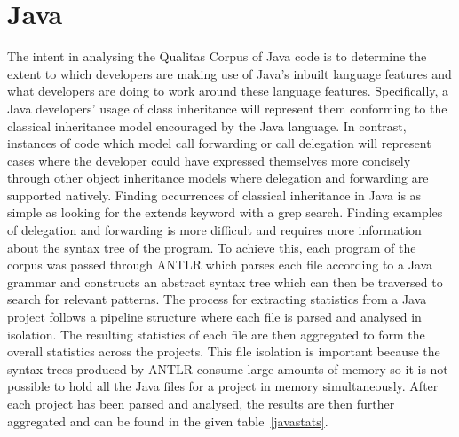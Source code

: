 \section{Java}
The intent in analysing the Qualitas Corpus of Java code is to determine the extent to which developers are making use of Java's inbuilt language features and what developers are doing to work around these language features. Specifically, a Java developers' usage of class inheritance will represent them conforming to the classical inheritance model encouraged by the Java language. In contrast, instances of code which model call forwarding or call delegation will represent cases where the developer could have expressed themselves more concisely through other object inheritance models where delegation and forwarding are supported natively. \newline
Finding occurrences of classical inheritance in Java is as simple as looking for the extends keyword with a grep search. Finding examples of delegation and forwarding is more difficult and requires more information about the syntax tree of the program. To achieve this, each program of the corpus was passed through ANTLR which parses each file according to a Java grammar and constructs an abstract syntax tree which can then be traversed to search for relevant patterns. \newline \newline
The process for extracting statistics from a Java project follows a pipeline structure where each file is parsed and analysed in isolation. The resulting statistics of each file are then aggregated to form the overall statistics across the projects. This file isolation is important because the syntax trees produced by ANTLR consume large amounts of memory so it is not possible to hold all the Java files for a project in memory simultaneously. After each project has been parsed and analysed, the results are then further aggregated and can be found in the given table~\ref{javastats}.

